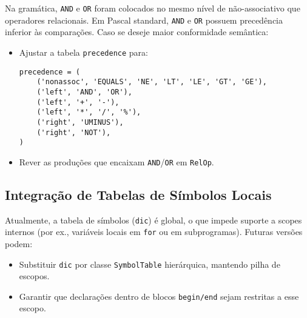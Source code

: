 Na gramática, \texttt{AND} e \texttt{OR} foram colocados no mesmo nível de não-associativo que operadores relacionais. Em Pascal standard, \texttt{AND} e \texttt{OR} possuem precedência inferior às comparações. Caso se deseje maior conformidade semântica:

\begin{itemize}
    \item Ajustar a tabela \texttt{precedence} para:
    
    \begin{verbatim}        
precedence = (
    ('nonassoc', 'EQUALS', 'NE', 'LT', 'LE', 'GT', 'GE'),
    ('left', 'AND', 'OR'),
    ('left', '+', '-'),
    ('left', '*', '/', '%'),
    ('right', 'UMINUS'),
    ('right', 'NOT'),
)
    \end{verbatim}
    
    \item Rever as produções que encaixam \texttt{AND}/\texttt{OR} em \texttt{RelOp}.
\end{itemize}

\subsection{Integração de Tabelas de Símbolos Locais}

Atualmente, a tabela de símbolos (\texttt{dic}) é global, o que impede suporte a scopes internos (por ex., variáveis locais em \texttt{for} ou em subprogramas). Futuras versões podem:

\begin{itemize}
    \item Substituir \texttt{dic} por classe \texttt{SymbolTable} hierárquica, mantendo pilha de escopos.
    \item Garantir que declarações dentro de blocos \texttt{begin/end} sejam restritas a esse escopo.
\end{itemize}